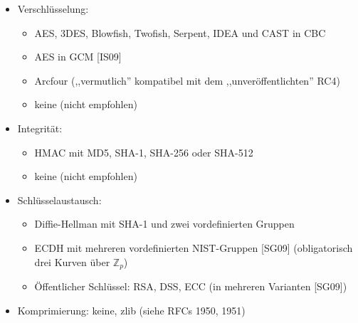 \documentclass[a4paper]{article}
\begin{document}
\begin{multicols}{3}
\begin{itemize}
              \begin{itemize}
                  \item
                        Verschlüsselung:

                        \begin{itemize}
                            \item
                                  AES, 3DES, Blowfish, Twofish, Serpent, IDEA und CAST in CBC
                            \item
                                  AES in GCM {[}IS09{]}
                            \item
                                  Arcfour (,,vermutlich'' kompatibel mit dem ,,unveröffentlichten''
                                  RC4)
                            \item
                                  keine (nicht empfohlen)
                        \end{itemize}
                  \item
                        Integrität:

                        \begin{itemize}
                            \item
                                  HMAC mit MD5, SHA-1, SHA-256 oder SHA-512
                            \item
                                  keine (nicht empfohlen)
                        \end{itemize}
                  \item
                        Schlüsselaustausch:

                        \begin{itemize}
                            \item
                                  Diffie-Hellman mit SHA-1 und zwei vordefinierten Gruppen
                            \item
                                  ECDH mit mehreren vordefinierten NIST-Gruppen {[}SG09{]}
                                  (obligatorisch drei Kurven über $\mathbb{Z}_p$)
                            \item
                                  Öffentlicher Schlüssel: RSA, DSS, ECC (in mehreren Varianten
                                  {[}SG09{]})
                        \end{itemize}
                  \item
                        Komprimierung: keine, zlib (siehe RFCs 1950, 1951)
              \end{itemize}
    \end{itemize}



\end{multicols}
\end{document}
